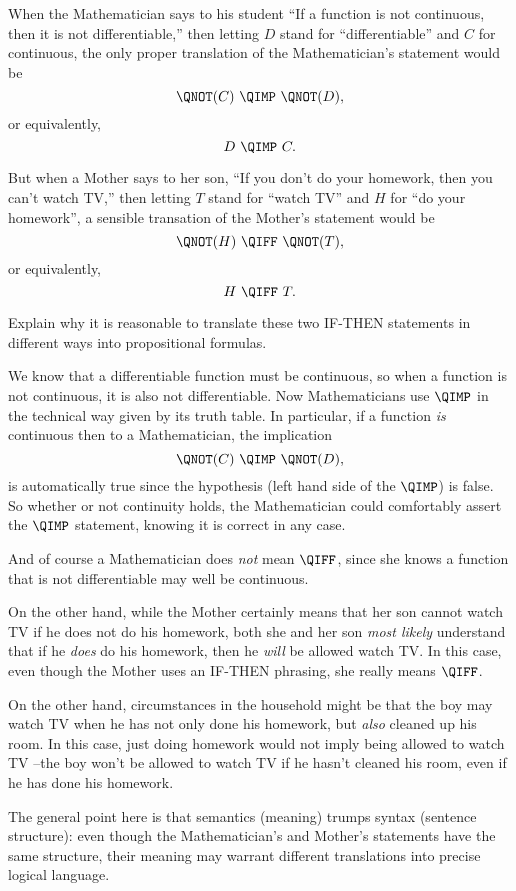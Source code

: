 \documentclass[handout]{mcs}
\begin{document}
\begin{problem}
When the Mathematician says to his student ``If a function is not
continuous, then it is not differentiable,'' then letting $D$ stand for
``differentiable'' and $C$ for continuous, the only proper translation of the
Mathematician's statement would be
\[
\QNOT(C)\ \QIMP\ \QNOT(D),
\]
or equivalently,
\[
D\ \QIMP\ C.
\]

But when a Mother says to her son, ``If you don't do your homework, then
you can't watch TV,'' then letting $T$ stand for ``watch TV'' and $H$ for
``do your homework'', a sensible transation of the Mother's statement would
be
\[
\QNOT(H)\ \QIFF\ \QNOT(T),
\]
or equivalently,
\[
H\ \QIFF\ T.
\]

Explain why it is reasonable to translate these two IF-THEN statements in
different ways into propositional formulas.

\begin{solution}
We know that a differentiable function must be continuous, so
  when a function is not continuous, it is also not differentiable.  Now
  Mathematicians use $\QIMP$ in the technical way given by its truth table.
  In particular, if a function \emph{is} continuous then to a
  Mathematician, the implication
\[
\QNOT(C)\ \QIMP\ \QNOT(D),
\]
is automatically true since the hypothesis (left hand side of the $\QIMP$)
is false.  So whether or not continuity holds, the Mathematician could
comfortably assert the $\QIMP$ statement, knowing it is correct in any
case.

And of course a Mathematician does \emph{not} mean $\QIFF$, since she
knows a function that is not differentiable may well be continuous.

On the other hand, while the Mother certainly means that her son cannot
watch TV if he does not do his homework, both she and her son \emph{most
  likely} understand that if he \emph{does} do his homework, then he
\emph{will} be allowed watch TV.  In this case, even though the Mother
uses an IF-THEN phrasing, she really means $\QIFF$.

On the other hand, circumstances in the household might be that the boy may
watch TV when he has not only done his homework, but \emph{also} cleaned up
his room.  In this case, just doing homework would not imply being allowed
to watch TV --the boy won't be allowed to watch TV if he hasn't cleaned his
room, even if he has done his homework.

The general point here is that semantics (meaning) trumps syntax (sentence
structure): even though the Mathematician's and Mother's statements have
the same structure, their meaning may warrant different translations into
precise logical language.

\end{solution}

\end{problem}
\end{document}
